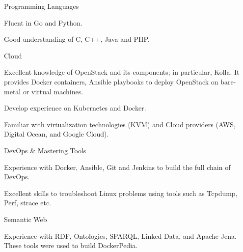 \begin{cventries}
  \cventry
    {Programming Languages}
    {}
    {}
    {}
    {
      \begin{cvitems}
        \item {Fluent in Go and Python.}
        \item {Good understanding of C, C++, Java and PHP.}
      \end{cvitems}
    }
    \cventry
    {Cloud}
    {}
    {}
    {}
    {
      \begin{cvitems}
        \item {Excellent knowledge of OpenStack and its components; in particular, Kolla. It provides Docker containers, Ansible playbooks to deploy OpenStack on bare-metal or virtual machines.}
        \item {Develop experience on Kubernetes and Docker.}
        \item {Familiar with virtualization technologies (KVM) and Cloud providers (AWS, Digital Ocean, and Google Cloud).}
      \end{cvitems}
    }

    \cventry
    {DevOps \& Mastering Tools}
    {}
    {}
    {}
    {
      \begin{cvitems}
        \item {Experience with Docker, Ansible, Git and Jenkins to build the full chain of DevOps.}
        \item {Excellent skills to troubleshoot Linux problems using tools such as Tcpdump, Perf, strace etc.}
      \end{cvitems}
    }
    
    \cventry
    {Semantic Web}
    {}
    {}
    {}
    {
      \begin{cvitems}
        \item {Experience with RDF, Ontologies, SPARQL, Linked Data, and Apache Jena. These tools were used to build DockerPedia.}
      \end{cvitems}
    }
        
    
\end{cventries}
